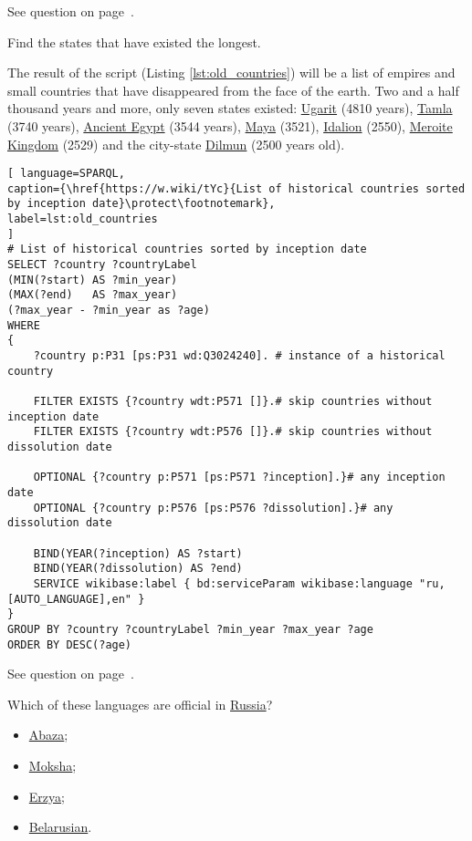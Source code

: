 See question on page~\pageref{question:population_density}.
\begin{exercise}
\label{answer:old_countries}

Find the states that have existed the longest.

\end{exercise}

The result of the script (Listing \ref{lst:old_countries}) will be a list of empires and small countries that have disappeared from the face of the earth. Two and a half thousand years and more, only seven states existed: \href{https://w.wiki/vAT}{Ugarit} (4810 years), \href{https://w.wiki/vAU}{Tamla} (3740 years), \href{https://w.wiki/vAX}{Ancient Egypt} (3544 years), \href{https://w.wiki/vAY}{Maya} (3521), \href{ https://w.wiki/vAZ}{Idalion} (2550), \href{https://w.wiki/vAb}{Meroite Kingdom} (2529) and the city-state \href{https://w.wiki/vAf}{Dilmun} (2500 years old).

\begin{lstlisting}[ language=SPARQL, 
caption={\href{https://w.wiki/tYc}{List of historical countries sorted by inception date}\protect\footnotemark},
label=lst:old_countries
]
# List of historical countries sorted by inception date
SELECT ?country ?countryLabel 
(MIN(?start) AS ?min_year)
(MAX(?end)   AS ?max_year) 
(?max_year - ?min_year as ?age)
WHERE
{
	?country p:P31 [ps:P31 wd:Q3024240]. # instance of a historical country
	
	FILTER EXISTS {?country wdt:P571 []}.# skip countries without inception date
	FILTER EXISTS {?country wdt:P576 []}.# skip countries without dissolution date
	
	OPTIONAL {?country p:P571 [ps:P571 ?inception].}# any inception date
	OPTIONAL {?country p:P576 [ps:P576 ?dissolution].}# any dissolution date
	
	BIND(YEAR(?inception) AS ?start)
	BIND(YEAR(?dissolution) AS ?end)  
	SERVICE wikibase:label { bd:serviceParam wikibase:language "ru,[AUTO_LANGUAGE],en" }
}
GROUP BY ?country ?countryLabel ?min_year ?max_year ?age
ORDER BY DESC(?age)
\end{lstlisting}

See question on page~\pageref{question:old_countries}.
\begin{exercise}
\label{answer:official_languages}
Which of these languages are official in \href{https://en.wikipedia.org/wiki/Russia}{Russia}?
\begin{itemize}
\item \href{https://en.wikipedia.org/wiki/Abaza_language}{Abaza};
\item \href{https://en.wikipedia.org/wiki/Moksha_language}{Moksha};
\item \href{https://en.wikipedia.org/wiki/Erzya_language}{Erzya};
\item \href{https://en.wikipedia.org/wiki/Belarusian_language}{Belarusian}.
\end{itemize}
\end{exercise}

